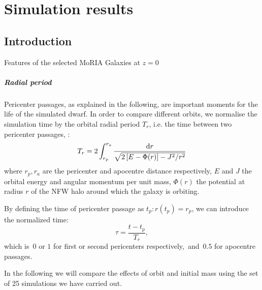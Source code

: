 
\chapter{Simulation results}
\label{ch:sim_results}

\section{Introduction}


\begin{sidewaystable}
 \centering
 \footnotesize
 
 \caption{Features of the selected MoRIA Galaxies at $z=0$} \label{tbl:galaxies}
\end{sidewaystable}


\paragraph*{Radial period}
Pericenter passages, as explained in the following, are important moments for the life of the simulated dwarf.
In order to compare different orbits, we normalise the simulation time by the orbital radial period $T_r$, i.e. the time between two pericenter passages, \citep{BinneyTremaine2008}:
\begin{equation}
    T_r = 2 \int^{r_a}_{r_p} \frac{\operatorname{d}\!{r}}{\sqrt{2\left[E-\Phi(r) \right] - J^2/r^2}}
    \label{eq:radial_period}
\end{equation}
where $r_p, r_a$ are the pericenter and apocentre distance respectively, $E$ and $J$ the orbital energy and angular momentum per unit mass, $\Phi(r)$ the potential at radius $r$ of the NFW halo around which the galaxy is orbiting.

By defining the time of pericenter passage as $t_p: r(t_p) = r_p$, we can introduce the normalized time:
\begin{equation}
\tau = \frac{t-t_p}{T_r},
\end{equation}
which is~$0$ or $1$ for first or second pericenters respectively,~and~$0.5$ for apocentre passages.

In the following we will compare the effects of orbit and initial mass using the set of 25 simulations we have carried out.


